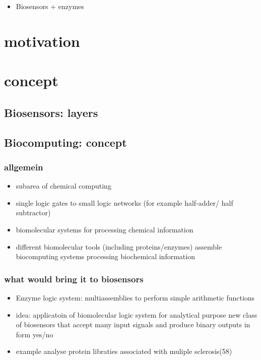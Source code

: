 \documentclass[runningheads]{llncs}
\begin{document}
	\begin{itemize}
		\item Biosensors + enzymes
	\end{itemize}


\section{motivation}


\section{concept}
\subsection{Biosensors: layers}
\subsection{Biocomputing: concept}
	\subsubsection{allgemein}
		\begin{itemize}
			\item subarea of chemical computing 
			\item single logic gates to small logic networks (for example half-adder/ half subtractor)
			\item biomolecular systems for processing chemical information
			\item different biomolecular tools (including proteins/enzymes) assemble biocomputing systems processing biochemical information \\	
		\end{itemize}
	\subsubsection{what would bring it to biosensors}	
	\begin{itemize}	
		\item Enzyme logic system: multiassemblies to perform simple arithmetic functions
		\item idea: applicatoin of biomolecular logic system for analytical purpose new class of biosensors that accept many input signals and produce binary outputs in form yes/no 
		\item example analyse protein libraties associated with muliple sclerosis(58)
	\end{itemize}
\end{document}
